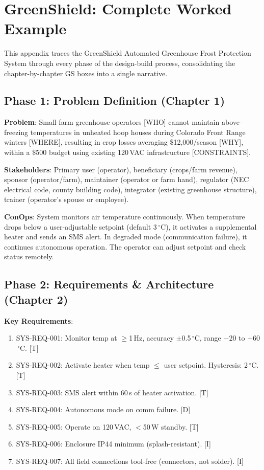 \documentclass[11pt,letterpaper,twoside,openany]{book}
\newcommand{\degC}{\ensuremath{{}^{\circ}\text{C}}}
\begin{document}
\chapter*{GreenShield: Complete Worked Example}

This appendix traces the GreenShield Automated Greenhouse Frost Protection System through every phase of the design-build process, consolidating the chapter-by-chapter \textsf{GS} boxes into a single narrative.

\section*{Phase 1: Problem Definition (Chapter 1)}
\textbf{Problem}: Small-farm greenhouse operators [WHO] cannot maintain above-freezing temperatures in unheated hoop houses during Colorado Front Range winters [WHERE], resulting in crop losses averaging \$12,000/season [WHY], within a \$500 budget using existing 120\,VAC infrastructure [CONSTRAINTS].

\textbf{Stakeholders}: Primary user (operator), beneficiary (crops/farm revenue), sponsor (operator/farm), maintainer (operator or farm hand), regulator (NEC electrical code, county building code), integrator (existing greenhouse structure), trainer (operator's spouse or employee).

\textbf{ConOps}: System monitors air temperature continuously. When temperature drops below a user-adjustable setpoint (default 3\,\degC{}), it activates a supplemental heater and sends an SMS alert. In degraded mode (communication failure), it continues autonomous operation. The operator can adjust setpoint and check status remotely.

\section*{Phase 2: Requirements \& Architecture (Chapter 2)}
\textbf{Key Requirements}:
\begin{enumerate}[nosep,leftmargin=1.5em]
\item SYS-REQ-001: Monitor temp at $\geq$1\,Hz, accuracy $\pm$0.5\,\degC{}, range $-20$ to $+60$\,\degC{}. [T]
\item SYS-REQ-002: Activate heater when temp $\leq$ user setpoint. Hysteresis: 2\,\degC{}. [T]
\item SYS-REQ-003: SMS alert within 60\,s of heater activation. [T]
\item SYS-REQ-004: Autonomous mode on comm failure. [D]
\item SYS-REQ-005: Operate on 120\,VAC, $<$50\,W standby. [T]
\item SYS-REQ-006: Enclosure IP44 minimum (splash-resistant). [I]
\item SYS-REQ-007: All field connections tool-free (connectors, not solder). [I]
\end{enumerate}
\end{document}
